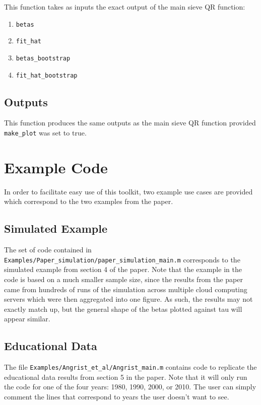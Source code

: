 \documentclass[12pt]{article}
\begin{document}
This function takes as inputs the exact output of the main sieve QR function:

\begin{enumerate}
    \item \lstinline{betas}
    \item \lstinline{fit_hat}
    \item \lstinline{betas_bootstrap}
    \item \lstinline{fit_hat_bootstrap}
\end{enumerate}

\subsection{Outputs}

This function produces the same outputs as the main sieve QR function provided \lstinline{make_plot} was set to true.

\section{Example Code}

In order to facilitate easy use of this toolkit, two example use cases are provided which correspond to the two examples from the paper.

\subsection{Simulated Example}

The set of code contained in \lstinline{Examples/Paper_simulation/paper_simulation_main.m} corresponds to the simulated example from section 4 of the paper. Note that the example in the code is based on a much smaller sample size, since the results from the paper came from hundreds of runs of the simulation across multiple cloud computing servers which were then aggregated into one figure. As such, the results may not exactly match up, but the general shape of the betas plotted against tau will appear similar.

\subsection{Educational Data}

The file \lstinline{Examples/Angrist_et_al/Angrist_main.m} contains code to replicate the educational data results from section 5 in the paper. Note that it will only run the code for one of the four years: 1980, 1990, 2000, or 2010. The user can simply comment the lines that correspond to years the user doesn't want to see.
\end{document}

